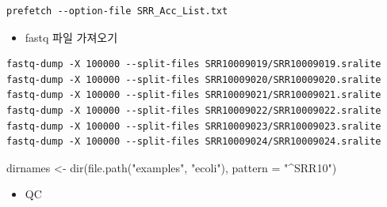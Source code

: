 \documentclass[
]{book}
\newenvironment{Shaded}{\begin{snugshade}}{\end{snugshade}}
\newcommand{\AttributeTok}[1]{\textcolor[rgb]{0.77,0.63,0.00}{#1}}
\newcommand{\FunctionTok}[1]{\textcolor[rgb]{0.00,0.00,0.00}{#1}}
\newcommand{\NormalTok}[1]{#1}
\newcommand{\OtherTok}[1]{\textcolor[rgb]{0.56,0.35,0.01}{#1}}
\newcommand{\StringTok}[1]{\textcolor[rgb]{0.31,0.60,0.02}{#1}}
\providecommand{\tightlist}{%
  \setlength{\itemsep}{0pt}\setlength{\parskip}{0pt}}
\begin{document}
\begin{verbatim}
prefetch --option-file SRR_Acc_List.txt
\end{verbatim}

\begin{itemize}
\tightlist
\item
  fastq 파일 가져오기
\end{itemize}

\begin{verbatim}
fastq-dump -X 100000 --split-files SRR10009019/SRR10009019.sralite
fastq-dump -X 100000 --split-files SRR10009020/SRR10009020.sralite
fastq-dump -X 100000 --split-files SRR10009021/SRR10009021.sralite
fastq-dump -X 100000 --split-files SRR10009022/SRR10009022.sralite
fastq-dump -X 100000 --split-files SRR10009023/SRR10009023.sralite
fastq-dump -X 100000 --split-files SRR10009024/SRR10009024.sralite
\end{verbatim}

\begin{Shaded}
\begin{Highlighting}[]
\NormalTok{dirnames }\OtherTok{\textless{}{-}} \FunctionTok{dir}\NormalTok{(}\FunctionTok{file.path}\NormalTok{(}\StringTok{"examples"}\NormalTok{, }\StringTok{"ecoli"}\NormalTok{), }\AttributeTok{pattern =} \StringTok{"\^{}SRR10"}\NormalTok{)}
\end{Highlighting}
\end{Shaded}

\begin{itemize}
\tightlist
\item
  QC
\end{itemize}
\end{document}
